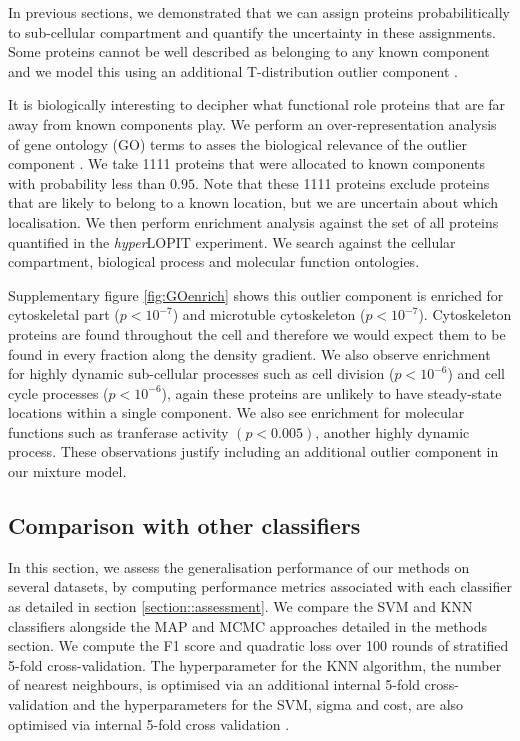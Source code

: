 \documentclass[12pt,english]{article}\usepackage[]{graphicx}\usepackage[]{color}
\begin{document}
In previous sections, we demonstrated that we can assign proteins
probabilitically to sub-cellular compartment and quantify the
uncertainty in these assignments. Some proteins cannot be well
described as belonging to any known component and we model this
using an additional T-distribution outlier component
{}.

It is biologically interesting to decipher what functional role
proteins that are far away from known components play. We perform an
over-representation analysis of gene ontology (GO) terms to asses the
biological relevance of the outlier component \citep{Boyle:2004,
  Yu:2012}. We take 1111 proteins that were allocated to known
components with probability less than $0.95$.  Note that these 1111
proteins exclude proteins that are likely to belong to a known
location, but we are uncertain about which localisation.  We then
perform enrichment analysis against the set of all proteins
quantified in the \textit{hyper}LOPIT experiment. We search against
the cellular compartment, biological process and molecular function
ontologies.

Supplementary figure \ref{fig:GOenrich} shows this outlier component
is enriched for cytoskeletal part ($p <10^{-7}$) and microtuble
cytoskeleton ($p <10^{-7}$). Cytoskeleton proteins are found
throughout the cell and therefore we would expect them to be found in
every fraction along the density gradient. We also observe enrichment
for highly dynamic sub-cellular processes such as cell division
($p <10^{-6}$) and cell cycle processes ($p <10^{-6}$), again these
proteins are unlikely to have steady-state locations within a single
component. We also see enrichment for molecular functions such as
tranferase activity $(p < 0.005)$, another highly dynamic
process. These observations justify including an additional outlier
component in our mixture model.


\clearpage

\subsection*{Comparison with other classifiers}

In this section, we assess the generalisation performance of our
methods on several datasets, by computing performance metrics
associated with each classifier as detailed in section
\ref{section::assessment}. We compare the SVM and KNN classifiers
alongside the MAP and MCMC approaches detailed in the methods
section. We compute the F1 score and quadratic loss over 100 rounds of
stratified 5-fold cross-validation. The hyperparameter for the KNN
algorithm, the number of nearest neighbours, is optimised via an
additional internal 5-fold cross-validation and the hyperparameters
for the SVM, sigma and cost, are also optimised via internal 5-fold
cross validation \citep{svm:2010}.
\end{document}
